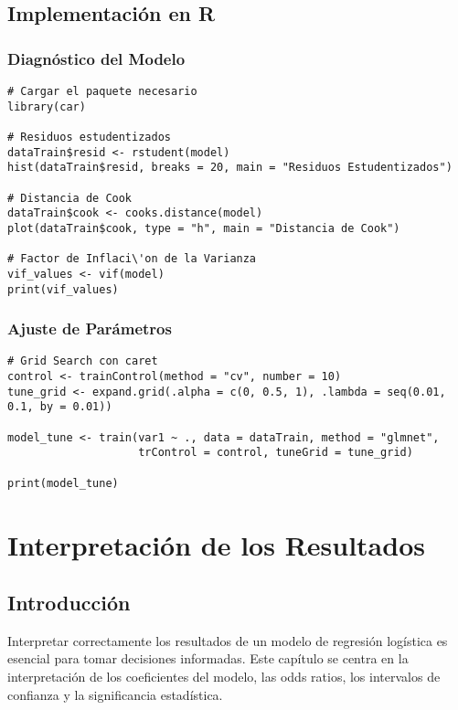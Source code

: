 \documentclass[a4paper]{report} %
\begin{document}
\section{Implementaci\'on en R}

\subsection{Diagn\'ostico del Modelo}

\begin{verbatim}
# Cargar el paquete necesario
library(car)

# Residuos estudentizados
dataTrain$resid <- rstudent(model)
hist(dataTrain$resid, breaks = 20, main = "Residuos Estudentizados")

# Distancia de Cook
dataTrain$cook <- cooks.distance(model)
plot(dataTrain$cook, type = "h", main = "Distancia de Cook")

# Factor de Inflaci\'on de la Varianza
vif_values <- vif(model)
print(vif_values)
\end{verbatim}

\subsection{Ajuste de Par\'ametros}

\begin{verbatim}
# Grid Search con caret
control <- trainControl(method = "cv", number = 10)
tune_grid <- expand.grid(.alpha = c(0, 0.5, 1), .lambda = seq(0.01, 0.1, by = 0.01))

model_tune <- train(var1 ~ ., data = dataTrain, method = "glmnet", 
                    trControl = control, tuneGrid = tune_grid)

print(model_tune)
\end{verbatim}



\chapter{Interpretación de los Resultados}

\section{Introducci\'on}

Interpretar correctamente los resultados de un modelo de regresi\'on log\'istica es esencial para tomar decisiones informadas. Este cap\'itulo se centra en la interpretaci\'on de los coeficientes del modelo, las odds ratios, los intervalos de confianza y la significancia estad\'istica.
\end{document}
